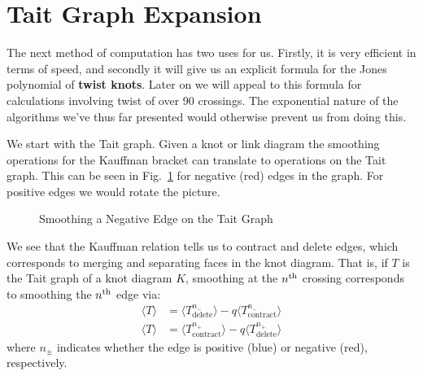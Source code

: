 \documentclass{article}
\theoremstyle{plain}
\begin{document}
    \section{Tait Graph Expansion}
        The next method of computation has two uses for us. Firstly, it is
        very efficient in terms of speed, and secondly it will give us an
        explicit formula for the Jones polynomial of \textbf{twist knots}.
        Later on we will appeal to this formula for calculations
        involving twist of over 90 crossings. The exponential nature of
        the algorithms we've thus far presented would otherwise prevent us
        from doing this.
        \par\hfill\par
        We start with the Tait graph. Given a knot or link diagram
        the smoothing operations for the Kauffman bracket can translate to
        operations on the Tait graph. This can be seen in
        Fig.~\ref{fig:tait_graph_kauffman_negative_smoothing} for negative
        (red) edges in the graph. For positive edges we would rotate the
        picture.
        \par\hfill\par
        \begin{figure}
            \centering
            \caption{Smoothing a Negative Edge on the Tait Graph}
            \label{fig:tait_graph_kauffman_negative_smoothing}
        \end{figure}
        We see that the Kauffman relation tells us to contract and delete
        edges, which corresponds to merging and separating faces in the
        knot diagram. That is, if $T$ is the Tait graph of a knot diagram
        $K$, smoothing at the $n^{\small\textrm{th}}$ crossing corresponds
        to smoothing the $n^{\small\textrm{th}}$ edge via:
        \begin{align}
            \label{eqns:kauffman_tait_relation}
            \langle{T}\rangle
            &=\langle{{T^{n_{-}}_{\textrm{delete}}}}\rangle
            -q\langle{{T^{n_{-}}_{\textrm{contract}}}}\rangle\\
            \langle{T}\rangle
            &=\langle{{T^{n_{+}}_{\textrm{contract}}}}\rangle
            -q\langle{{T^{n_{+}}_{\textrm{delete}}}}\rangle
        \end{align}
        where $n_{\pm}$ indicates whether the edge is positive (blue) or
        negative (red), respectively.
\end{document}
